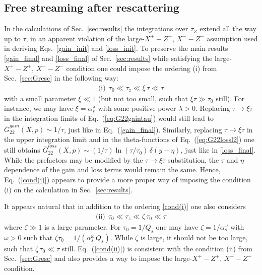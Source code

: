 \documentclass[onecolumn,showpacs,nobibnotes,nofootinbib,12pt,aps,prd,showpacs,notitlepage,nofootinbib,preprintnumbers,amsmath,amssymb]{article}
\def\eq#1{{Eq.~(\ref{#1})}}
\newcommand{\as}{\alpha_s}
\begin{document}

\subsection{Free streaming after rescattering}

In the calculations of Sec.~\ref{sec:results} the integrations over
$\tau_Z$ extend all the way up to $\tau$, in an apparent violation of
the large-$X^+ - Z^+$, $X^- - Z^-$ assumption used in deriving
Eqs.~\eqref{gain_init} and \eqref{loss_init}. To preserve the main
results \eqref{gain_final} and \eqref{loss_final} of
Sec.~\ref{sec:results} while satisfying the large-$X^+ - Z^+$, $X^- -
Z^-$ condition one could impose the ordering (i) from
Sec.~\ref{sec:Gresc} in the following way:
\begin{align}\label{cond(i)}
\mbox{(i)} \ \   \tau_0 \ll \tau_z \ll \xi \, \tau \ll \tau
\end{align}
with a small parameter $\xi \ll 1$ (but not too small, such that $\xi
\tau \gg \tau_0$ still). For instance, we may have $\xi = \as^\lambda$
with some positive power $\lambda >0$. Replacing $\tau \to \xi \tau$
in the integration limits of \eq{eq:G22gaintau} would still lead to
$\bar G_{22}^{gain}(X,p) \sim 1/\tau$, just like in
\eq{gain_final}. Similarly, replacing $\tau \to \xi \tau$ in the upper
integration limit and in the theta-functions of \eq{eq:G22lossl2} one
still obtains $\bar G_{22}^{loss}(X,p) \sim (1/\tau) \ln(\tau/\tau_0)
\, \delta (y-\eta)$, just like in \eqref{loss_final}. While the
prefactors may be modified by the $\tau \to \xi \tau$ substitution,
the $\tau$ and $\eta$ dependence of the gain and loss terms would
remain the same. Hence, \eq{cond(i)} appears to provide a more proper
way of imposing the condition (i) on the calculation in
Sec.~\ref{sec:results}.

It appears natural that in addition to the ordering \eqref{cond(i)}
one also considers
\begin{align}\label{cond(ii)}
  \mbox{(ii)} \ \ \tau_0 \ll \tau_z \ll \zeta \, \tau_0 \ll \tau
\end{align}
where $\zeta \gg 1$ is a large parameter. For $\tau_0 = 1/Q_s$ one may
have $\zeta = 1/\as^\omega$ with $\omega >0$ such that $\zeta \tau_0 =
1/(\as^\omega \, Q_s)$. While $\zeta$ is large, it should not be too
large, such that $\zeta \, \tau_0 \ll \tau$ still. \eq{cond(ii)} is
consistent with the condition (ii) from Sec.~\ref{sec:Gresc} and also
provides a way to impose the large-$X^+ - Z^+$, $X^- - Z^-$ condition.
\end{document}
